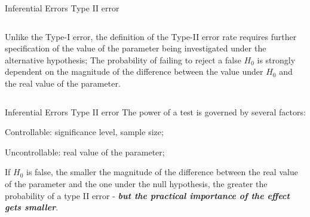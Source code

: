 \documentclass[t]{beamer}
\begin{document}

\begin{ftst}
{Inferential Errors}
{Type II error}
\begin{columns}[T]
		Unlike the Type-I error, the definition of the Type-II error rate requires further specification of the value of the parameter being investigated under the alternative hypothesis;
		\vone
		The probability of failing to reject a false $H_0$ is strongly dependent on the magnitude of the difference between the value under $H_0$ and the real value of the parameter.
	\end{columns}

\end{ftst}


\begin{ftst}
{Inferential Errors}
{Type II error}
The power of a test is governed by several factors:

\bitems Controllable: significance level, sample size;
	\item Uncontrollable: real value of the parameter;
\eitem

If $H_0$ is false, the smaller the magnitude of the difference between the real value of the parameter and the one under the null hypothesis, the greater the probability of a type II error - \textbf{\textit{but the practical importance of the effect gets smaller}}.
\end{ftst}
\end{document}
